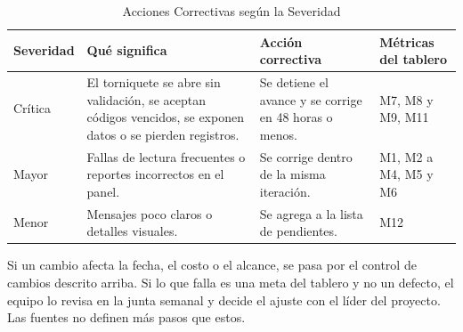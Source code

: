 \begin{table}[tbp]
	\caption{Acciones Correctivas según la Severidad}
	\label{tab:correctivas}
	\small\setlength{\tabcolsep}{3pt}
	\begin{tabular}{P{2cm}P{5.2cm}P{4cm}P{3.6cm}}
		\toprule
		Severidad & Qué significa & Acción correctiva & Métricas del tablero \\
		\midrule
		Crítica & El torniquete se abre sin validación, se aceptan códigos vencidos, se exponen datos o se pierden registros. & Se detiene el avance y se corrige en 48 horas o menos. & M7, M8 y M9, M11 \\
		Mayor & Fallas de lectura frecuentes o reportes incorrectos en el panel. & Se corrige dentro de la misma iteración. & M1, M2 a M4, M5 y M6 \\
		Menor & Mensajes poco claros o detalles visuales. & Se agrega a la lista de pendientes. & M12 \\
		\bottomrule
	\end{tabular}
\end{table}

Si un cambio afecta la fecha, el costo o el alcance, se pasa por el control de
cambios descrito arriba. Si lo que falla es una meta del tablero y no un
defecto, el equipo lo revisa en la junta semanal y decide el ajuste con el
líder del proyecto. Las fuentes no definen más pasos que estos.
